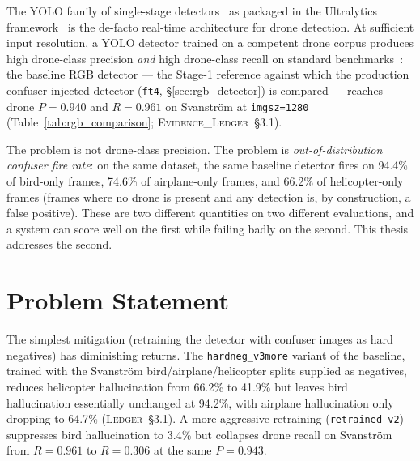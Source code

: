 \documentclass[12pt,a4paper,oneside,openright]{book}
\begin{document}
The YOLO family of single-stage detectors~\cite{redmon2016yolo} as packaged in the Ultralytics framework~\cite{ultralytics2024} is the de-facto real-time architecture for drone detection. At sufficient input resolution, a YOLO detector trained on a competent drone corpus produces high drone-class precision \emph{and} high drone-class recall on standard benchmarks~\cite{svanstrom2021real,jiang2021antiuav}: the baseline RGB detector --- the Stage-1 reference against which the production confuser-injected detector (\texttt{ft4}, \S\ref{sec:rgb_detector}) is compared --- reaches drone $P=0.940$ and $R=0.961$ on Svanstr\"om at \texttt{imgsz=1280} (Table~\ref{tab:rgb_comparison}; \textsc{Evidence\_Ledger}~\S3.1).

The problem is not drone-class precision. The problem is \emph{out-of-distribution confuser fire rate}: on the same dataset, the same baseline detector fires on 94.4\% of bird-only frames, 74.6\% of airplane-only frames, and 66.2\% of helicopter-only frames (frames where no drone is present and any detection is, by construction, a false positive). These are two different quantities on two different evaluations, and a system can score well on the first while failing badly on the second. This thesis addresses the second.

\section{Problem Statement}

The simplest mitigation (retraining the detector with confuser images as hard negatives) has diminishing returns. The \texttt{hardneg\_v3more} variant of the baseline, trained with the Svanstr\"om bird/airplane/helicopter splits supplied as negatives, reduces helicopter hallucination from 66.2\% to 41.9\% but leaves bird hallucination essentially unchanged at 94.2\%, with airplane hallucination only dropping to 64.7\% (\textsc{Ledger}~\S3.1). A more aggressive retraining (\texttt{retrained\_v2}) suppresses bird hallucination to 3.4\% but collapses drone recall on Svanstr\"om from $R=0.961$ to $R=0.306$ at the same $P=0.943$.
\end{document}
